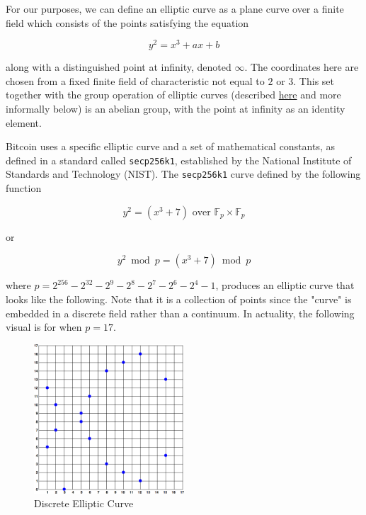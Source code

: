 \documentclass{article}
\begin{document}
    For our purposes, we can define an elliptic curve as a plane curve over a finite field which consists of the points satisfying the equation

    \begin{equation}
    y^2 = x^3 + ax + b
    \end{equation}

    along with a distinguished point at infinity, denoted $\infty$. The coordinates here are chosen from a fixed finite field of characteristic not equal to $2$ or $3$. This set together with the group operation of elliptic curves (described \href{https://en.wikipedia.org/wiki/Elliptic_curve#The_group_law}{here} and more informally below) is an abelian group, with the point at infinity as an identity element.

    Bitcoin uses a specific elliptic curve and a set of mathematical constants, as defined in a standard called \texttt{secp256k1}, established by the National Institute of Standards and Technology (NIST). The \texttt{secp256k1} curve defined by the following function

    \begin{equation}
    y^2 = (x^3 + 7) \text{ over } \mathbb{F}_p \times \mathbb{F}_p
    \end{equation}

    or

    \begin{equation}
    y^2 \bmod p = (x^3 + 7) \bmod p
    \end{equation}

    where $p = 2^{256} - 2^{32} - 2^9 - 2^8 - 2^7 - 2^6 - 2^4 - 1$, produces an elliptic curve that looks like the following. Note that it is a collection of points since the "curve" is embedded in a discrete field rather than a continuum. In actuality, the following visual is for when $p = 17$.

    \begin{figure}[H]
    \centering
    \includegraphics[width=0.5\textwidth]{img/discrete_elliptic_curve.png}
    \caption{Discrete Elliptic Curve}
    \end{figure}
\end{document}
